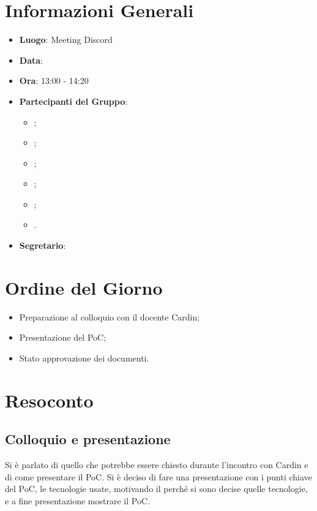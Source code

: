 \section{Informazioni Generali}

\begin{itemize}
\item{\textbf{Luogo}}: Meeting Discord
\item{\textbf{Data}}: \D
\item{\textbf{Ora}}: 13:00 - 14:20
\item{\textbf{Partecipanti del Gruppo}}: 
	\begin{itemize}
	\item{\EP{};} 
	\item{\FP{};}
	\item{\GC{};}
	\item{\LW{};}
	\item{\MG{};}
	\item{\PV{}.}
	\end{itemize} 
\item{\textbf{Segretario}}: \PV{}	
\end{itemize}

\section{Ordine del Giorno}
\begin{itemize}
\item{Preparazione al colloquio con il docente Cardin};
\item{Presentazione del PoC};
\item{Stato approvazione dei documenti}.
\end{itemize}

\section{Resoconto}
 
\subsection{Colloquio e presentazione} 
Si è parlato di quello che potrebbe essere chiesto durante l'incontro con Cardin e di come presentare il PoC. Si è deciso di fare una presentazione con i punti chiave del PoC, le tecnologie usate, motivando il perché si sono decise quelle tecnologie, e a fine presentazione mostrare il PoC.  
 
